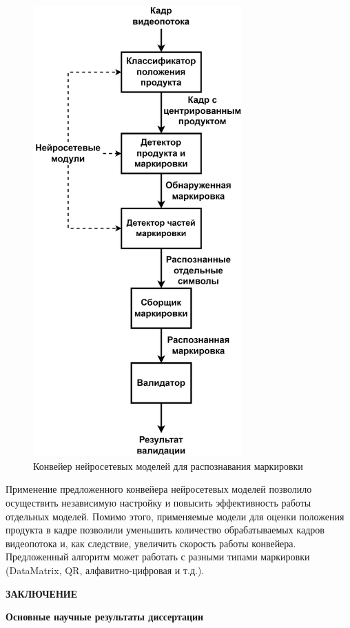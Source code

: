 \documentclass{thesisby}
\begin{document}
\begin{figure}[!ht]
	\centering
	\includegraphics[width=8cm]{man-source/images/ch4/savushkin_structure.png}
	\caption{Конвейер нейросетевых моделей для распознавания маркировки}
	\label{fig:general_diagram}
\end{figure}

Применение предложенного конвейера нейросетевых моделей позволило осуществить независимую настройку и повысить эффективность работы отдельных моделей. Помимо этого, применяемые модели для оценки положения продукта в кадре позволили уменьшить количество обрабатываемых кадров видеопотока и, как следствие, увеличить скорость работы конвейера. Предложенный алгоритм может работать с разными типами маркировки (DataMatrix, QR, алфавитно-цифровая и т.д.).

\bigskip
\centerline{\bf ЗАКЛЮЧЕНИЕ}
\smallskip
{\bf Основные научные результаты диссертации}
\smallskip


\end{document}

